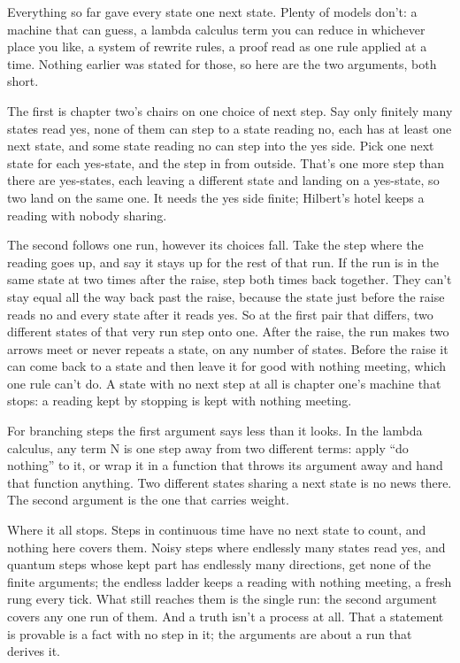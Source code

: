 \documentclass[11pt,twoside]{article}
\theoremstyle{thielethm}
\theoremstyle{thieledef}
\theoremstyle{thieledef}
\theoremstyle{thieledef}
\theoremstyle{thielethm}
\theoremstyle{thieleobs}
\theoremstyle{thielethm}
\begin{document}
Everything so far gave every state one next state. Plenty of models don't: a machine that can guess, a lambda calculus term you can reduce in whichever place you like, a system of rewrite rules, a proof read as one rule applied at a time. Nothing earlier was stated for those, so here are the two arguments, both short.

The first is chapter two's chairs on one choice of next step. Say only finitely many states read yes, none of them can step to a state reading no, each has at least one next state, and some state reading no can step into the yes side. Pick one next state for each yes-state, and the step in from outside. That's one more step than there are yes-states, each leaving a different state and landing on a yes-state, so two land on the same one. It needs the yes side finite; Hilbert's hotel keeps a reading with nobody sharing.

The second follows one run, however its choices fall. Take the step where the reading goes up, and say it stays up for the rest of that run. If the run is in the same state at two times after the raise, step both times back together. They can't stay equal all the way back past the raise, because the state just before the raise reads no and every state after it reads yes. So at the first pair that differs, two different states of that very run step onto one. After the raise, the run makes two arrows meet or never repeats a state, on any number of states. Before the raise it can come back to a state and then leave it for good with nothing meeting, which one rule can't do. A state with no next step at all is chapter one's machine that stops: a reading kept by stopping is kept with nothing meeting.

For branching steps the first argument says less than it looks. In the lambda calculus, any term N is one step away from two different terms: apply ``do nothing'' to it, or wrap it in a function that throws its argument away and hand that function anything. Two different states sharing a next state is no news there. The second argument is the one that carries weight.

Where it all stops. Steps in continuous time have no next state to count, and nothing here covers them. Noisy steps where endlessly many states read yes, and quantum steps whose kept part has endlessly many directions, get none of the finite arguments; the endless ladder keeps a reading with nothing meeting, a fresh rung every tick. What still reaches them is the single run: the second argument covers any one run of them. And a truth isn't a process at all. That a statement is provable is a fact with no step in it; the arguments are about a run that derives it.
\end{document}
